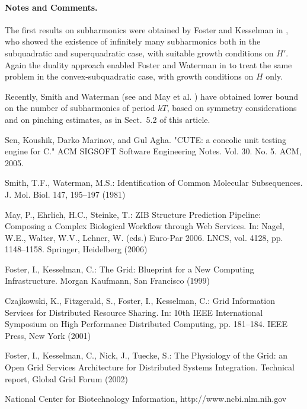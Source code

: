 \documentclass[lnicst]{svmultln}
\begin{document}
\paragraph{Notes and Comments.}
The first results on subharmonics were
obtained by Foster and Kesselman in \cite{fos:kes}, who showed the existence of
infinitely many subharmonics both in the subquadratic and superquadratic
case, with suitable growth conditions on $H'$. Again the duality
approach enabled Foster and Waterman in \cite{fos:kes:2} to treat the
same problem in the convex-subquadratic case, with growth conditions on
$H$ only.

Recently, Smith and Waterman (see \cite{smit:wat} and May et al. \cite{mes})
have obtained lower bound on the number of subharmonics of period $kT$,
based on symmetry considerations and on pinching estimates, as in
Sect.~5.2 of this article.

%
%
\begin{thebibliography}{5}

 Sen, Koushik, Darko Marinov, and Gul Agha. "CUTE: a concolic unit testing engine for C." ACM SIGSOFT Software Engineering Notes. Vol. 30. No. 5. ACM, 2005.


 Smith, T.F., Waterman, M.S.: Identification of Common Molecular
Subsequences. J. Mol. Biol. 147, 195--197 (1981)

 May, P., Ehrlich, H.C., Steinke, T.: ZIB Structure Prediction Pipeline:
Composing a Complex Biological Workflow through Web Services. In: Nagel,
W.E., Walter, W.V., Lehner, W. (eds.) Euro-Par 2006. LNCS, vol. 4128,
pp. 1148--1158. Springer, Heidelberg (2006)

 Foster, I., Kesselman, C.: The Grid: Blueprint for a New Computing
Infrastructure. Morgan Kaufmann, San Francisco (1999)

 Czajkowski, K., Fitzgerald, S., Foster, I., Kesselman, C.: Grid
Information Services for Distributed Resource Sharing. In: 10th IEEE
International Symposium on High Performance Distributed Computing, pp.
181--184. IEEE Press, New York (2001)

 Foster, I., Kesselman, C., Nick, J., Tuecke, S.: The Physiology of the
Grid: an Open Grid Services Architecture for Distributed Systems
Integration. Technical report, Global Grid Forum (2002)

 National Center for Biotechnology Information, http://www.ncbi.nlm.nih.gov

\end{thebibliography}
%
\end{document}
